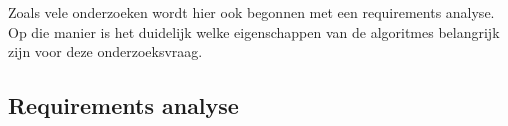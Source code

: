
\chapter{}%

\label{ch:methodologie}




Zoals vele onderzoeken wordt hier ook begonnen met een requirements analyse. Op die manier is het duidelijk welke eigenschappen van de algoritmes belangrijk zijn voor deze onderzoeksvraag.



\section{Requirements analyse}

